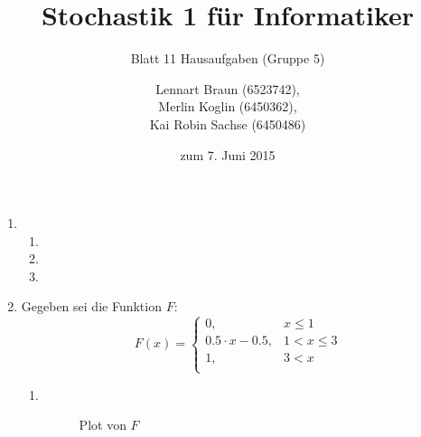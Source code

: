\documentclass[a4paper]{scrartcl}
\title{Stochastik 1 für Informatiker}
\subtitle{Blatt 11 Hausaufgaben (Gruppe 5)}
\author{
    Lennart Braun (6523742), \\
    Merlin Koglin (6450362), \\
    Kai Robin Sachse (6450486)
}
\date{zum 7. Juni 2015}
\begin{document}
\maketitle

\begin{enumerate}[label=\bfseries\arabic*.]
    \item
        \begin{enumerate}[label=(\alph*)]
            \item

            \item

            \item

        \end{enumerate}

    \item
        Gegeben sei die Funktion $F$:
        \begin{equation*}
            F(x) =
            \begin{cases}
                0, & x \leq 1 \\
                \num{0,5} \cdot x - \num{0,5}, & 1 < x \leq 3 \\
                1, & 3 < x \\
            \end{cases}
        \end{equation*}
        \begin{enumerate}[label=(\alph*)]
            \item \hfill \\
                \begin{figure}[H]
                    \centering
                    \caption{Plot von $F$}
                \end{figure}


\end{enumerate}
\end{enumerate}
\end{document}
